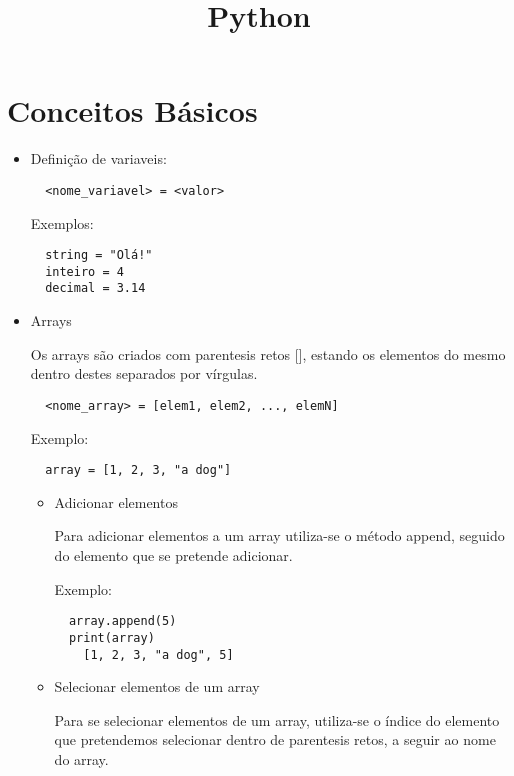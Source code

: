 \documentclass{article}
\title{Python}
\begin{document}
  \maketitle
  \section{Conceitos B\'asicos}
  
  \begin{itemize}
  \item Defini\c c\~ao de variaveis:
  
  \begin{lstlisting}
  <nome_variavel> = <valor>
  \end{lstlisting}
  
  Exemplos:
  
  \begin{lstlisting}
  string = "Olá!"
  inteiro = 4
  decimal = 3.14
  \end{lstlisting}
  
  \item Arrays
  
  Os arrays s\~ao criados com parentesis retos [], estando os elementos do mesmo dentro destes separados por v\'irgulas.
  
  \begin{lstlisting}
  <nome_array> = [elem1, elem2, ..., elemN]
  \end{lstlisting}
  
  Exemplo:
  
  \begin{lstlisting}
  array = [1, 2, 3, "a dog"]
  \end{lstlisting}
  
  \begin{itemize}
  \item Adicionar elementos
  
  Para adicionar elementos a um array utiliza-se o m\'etodo append, seguido do elemento que se pretende adicionar.
  
  Exemplo:
  
  \begin{lstlisting}
  array.append(5)
  print(array)
    [1, 2, 3, "a dog", 5]
  \end{lstlisting}
  
  \item Selecionar elementos de um array
  
  Para se selecionar elementos de um array, utiliza-se o \'indice do elemento que pretendemos selecionar dentro de parentesis retos, a seguir ao nome do array.
  

\end{itemize}
\end{itemize}
\end{document}
